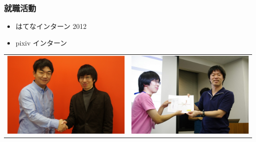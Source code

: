 \documentclass[dvipdfm,cjk,14pt,hyperref={bookmarks=false,compress,slidestop}]{beamer}
\begin{document}
\begin{frame}
 \frametitle{就職活動}
 \begin{itemize}
  \item はてなインターン 2012
  \item pixiv インターン
 \end{itemize}
 \vspace{-20pt}
 \begin{center}
  \begin{tabular}{cc}
   \includegraphics[clip, height=38truemm]{pixiv} & \includegraphics[clip, height=38truemm]{hatena} \\ 
  \end{tabular}
 \end{center}
\end{frame}
\end{document}

